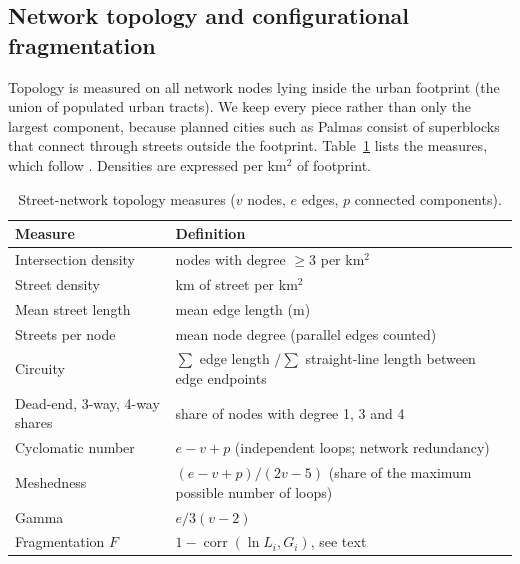 \subsection{Network topology and configurational fragmentation}

Topology is measured on all network nodes lying inside the urban footprint (the union of populated urban
tracts). We keep every piece rather than only the largest component, because planned cities such as Palmas
consist of superblocks that connect through streets outside the footprint. Table~\ref{tab:topodef} lists the
measures, which follow \citet{knaap2024segregated}. Densities are expressed per km$^2$ of footprint.

\begin{table}[htbp]
\centering\small
\caption{Street-network topology measures ($v$ nodes, $e$ edges, $p$ connected components).}\label{tab:topodef}
\begin{tabular}{p{4.2cm}p{9.3cm}}
\toprule
Measure & Definition \\
\midrule
Intersection density & nodes with degree $\ge 3$ per km$^2$ \\
Street density & km of street per km$^2$ \\
Mean street length & mean edge length (m) \\
Streets per node & mean node degree (parallel edges counted) \\
Circuity & $\sum$ edge length $/ \sum$ straight-line length between edge endpoints \\
Dead-end, 3-way, 4-way shares & share of nodes with degree 1, 3 and 4 \\
Cyclomatic number & $e - v + p$ (independent loops; network redundancy) \\
Meshedness & $(e - v + p)/(2v - 5)$ (share of the maximum possible number of loops) \\
Gamma & $e / 3(v - 2)$ \\
Fragmentation $F$ & $1 - \operatorname{corr}(\ln L_i, G_i)$, see text \\
\bottomrule
\end{tabular}
\end{table}

